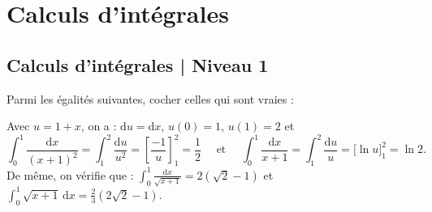 

\section{Calculs d'intégrales}
\subsection{Calculs d'intégrales | Niveau 1}

\begin{question}
Parmi les égalités suivantes, cocher celles qui sont vraies : 
\begin{answers}  
\end{answers}
\vskip2mm
\begin{explanations}
Avec $u=1+x$, on a : $\mathrm{d}u=\mathrm{d}x$, $u(0)=1$, $u(1)=2$ et
$$\int _0^1\frac{\mathrm{d}x}{(x+1)^2}=\int _1^2\frac{\mathrm{d}u}{u^2}=\left[\frac{-1}{u}\right]_1^2=\frac{1}{2}\quad \mbox{ et }\quad \int _0^1\frac{\mathrm{d}x}{x+1}=\int _1^2\frac{\mathrm{d}u}{u}=\Big[\ln u\Big]_1^2=\ln 2.$$
De même, on vérifie que : 
$\displaystyle \int _0^1\frac{\mathrm{d}x}{\sqrt{x+1}}=2(\sqrt{2}-1)$ et $\displaystyle \int _0^1\sqrt{x+1}\,\mathrm{d}x=\frac{2}{3}(2\sqrt{2}-1)$.
\end{explanations}
\end{question}

